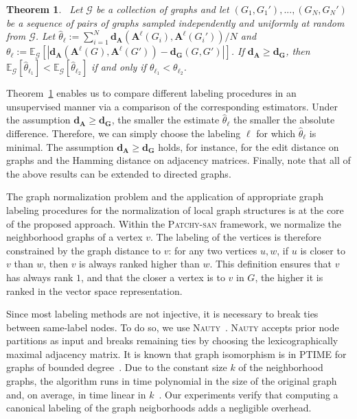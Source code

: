 \documentclass{article}
\newtheorem{thmx}{Theorem}
\newcommand{\patchysan}{{\textsc{Patchy-san}}\xspace}
\newcommand{\nauty}{{\textsc{Nauty}}\xspace}
\begin{document}
\begin{thmx}~\label{thrm:graph_norm_expectation}
Let $\mathcal{G}$ be a collection of graphs and let $(G_1,G_1'), ..., (G_N,G_N')$ be a sequence of pairs of graphs sampled independently and uniformly at random from $\mathcal{G}$. Let 
$\hat{\theta}_{\ell} := \sum_{i=1}^{N} \mathbf{d}_{\mathbf{A}}\left( \mathbf{A}^{\ell}(G_i), \mathbf{A}^{\ell}(G_i')\right) / N$ and $\theta_{\ell} := \mathbb{E}_{\mathcal{G}}\left[\left| \mathbf{d}_{\mathbf{A}}\left( \mathbf{A}^{\ell}(G), \mathbf{A}^{\ell}(G')\right) - \mathbf{d}_{\mathbf{G}}(G, G')\right|\right]$. If $\mathbf{d}_{\mathbf{A}} \geq \mathbf{d}_{\mathbf{G}}$, then $\mathbb{E}_{\mathcal{G}}[\hat{\theta}_{\ell_1}] < \mathbb{E}_{\mathcal{G}}[\hat{\theta}_{\ell_2}]$ if and only if $\theta_{\ell_1} < \theta_{\ell_2}$.
\end{thmx}

Theorem~\ref{thrm:graph_norm_expectation} enables us to compare different labeling procedures in an unsupervised manner via a comparison of the corresponding estimators.  Under the assumption $\mathbf{d}_{\mathbf{A}} \geq \mathbf{d}_{\mathbf{G}}$, the smaller the estimate $\hat{\theta}_{\ell}$ the smaller the absolute difference. Therefore, we can simply choose the labeling $\ell$ for which $\hat{\theta}_{\ell}$ is minimal. The assumption $\mathbf{d}_{\mathbf{A}} \geq \mathbf{d}_{\mathbf{G}}$ holds, for instance, for the edit distance on graphs and the Hamming distance on adjacency matrices. Finally, note that all of the above results can be extended to directed graphs. 

The graph normalization problem and the application of appropriate graph labeling procedures for the normalization of local graph structures is at the core of the proposed approach. Within the \patchysan framework, we normalize the neighborhood graphs of a vertex $v$. The labeling of the vertices is therefore constrained by the graph distance to  $v$: for any two vertices $u, w$, if $u$ is closer to $v$ than $w$, then $v$ is always ranked higher than $w$. 
This definition ensures that $v$ has always rank $1$, and that the closer a vertex is to $v$ in $G$, the higher it is ranked in the vector space representation.

Since most labeling methods are not injective, it is necessary to break ties between same-label nodes. To do so, we use \nauty~\cite{McKay:2014}. \nauty accepts prior node partitions as input and breaks remaining ties by choosing the lexicographically maximal adjacency matrix. It is known that graph isomorphism is in PTIME for graphs of bounded degree~\cite{luks:1982}. Due to the constant size $k$ of the neighborhood graphs, the algorithm runs in time polynomial in the size of the original graph and, on average, in time linear in $k$~\cite{Babai:1980}. Our experiments verify that computing a canonical labeling of the graph neigborhoods adds a negligible overhead.
\end{document}

